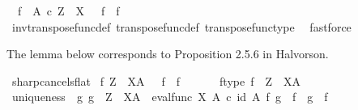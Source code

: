 \begin{isabellebody}
\ \ {\isachardoublequoteopen}f\ {\isacharcolon}{\kern0pt}\ A\ {\isasymtimes}\isactrlsub c\ Z\ {\isasymrightarrow}\ X\ \ {\isasymLongrightarrow}\ {\isacharparenleft}{\kern0pt}f\isactrlsup {\isasymsharp}{\isacharparenright}{\kern0pt}\isactrlsup {\isasymflat}\ {\isacharequal}{\kern0pt}\ f{\isachardoublequoteclose}\isanewline
%
\isadelimproof
\ \ %
\endisadelimproof
%
\isatagproof
{}\isamarkupfalse%
\ inv{\isacharunderscore}{\kern0pt}transpose{\isacharunderscore}{\kern0pt}func{\isacharunderscore}{\kern0pt}def{}\ transpose{\isacharunderscore}{\kern0pt}func{\isacharunderscore}{\kern0pt}def\ transpose{\isacharunderscore}{\kern0pt}func{\isacharunderscore}{\kern0pt}type\ \isamarkupfalse%
\ fastforce%
\endisatagproof
{\isafoldproof}%
%
\isadelimproof
%
\endisadelimproof
%
\begin{isamarkuptext}%
The lemma below corresponds to Proposition 2.5.6 in Halvorson.%
\end{isamarkuptext}\isamarkuptrue%
\isamarkupfalse%
\ sharp{\isacharunderscore}{\kern0pt}cancels{\isacharunderscore}{\kern0pt}flat{\isacharcolon}{\kern0pt}\isanewline
\ {\isachardoublequoteopen}f{\isacharcolon}{\kern0pt}\ Z\ {\isasymrightarrow}\ X\isactrlbsup A\isactrlesup \ \ {\isasymLongrightarrow}\ {\isacharparenleft}{\kern0pt}f\isactrlsup {\isasymflat}{\isacharparenright}{\kern0pt}\isactrlsup {\isasymsharp}\ {\isacharequal}{\kern0pt}\ f{\isachardoublequoteclose}\isanewline
%
\isadelimproof
%
\endisadelimproof
%
\isatagproof
{}\isamarkupfalse%
\ {\isacharminus}{\kern0pt}\ \isanewline
\ \ \isamarkupfalse%
\ f{\isacharunderscore}{\kern0pt}type{\isacharcolon}{\kern0pt}\ {\isachardoublequoteopen}f\ {\isacharcolon}{\kern0pt}\ Z\ {\isasymrightarrow}\ X\isactrlbsup A\isactrlesup {\isachardoublequoteclose}\isanewline
\ \ \isamarkupfalse%
\ \isamarkupfalse%
\ uniqueness{\isacharcolon}{\kern0pt}\ {\isachardoublequoteopen}{\isasymforall}\ g{\isachardot}{\kern0pt}\ g\ {\isacharcolon}{\kern0pt}\ Z\ {\isasymrightarrow}\ X\isactrlbsup A\isactrlesup \ {\isasymlongrightarrow}\ eval{\isacharunderscore}{\kern0pt}func\ X\ A\ {\isasymcirc}\isactrlsub c\ {\isacharparenleft}{\kern0pt}id\ A\ {\isasymtimes}\isactrlsub f\ g{\isacharparenright}{\kern0pt}\ {\isacharequal}{\kern0pt}\ f\isactrlsup {\isasymflat}\ {\isasymlongrightarrow}\ g\ {\isacharequal}{\kern0pt}\ {\isacharparenleft}{\kern0pt}f\isactrlsup {\isasymflat}{\isacharparenright}{\kern0pt}\isactrlsup {\isasymsharp}{\isachardoublequoteclose}\isanewline
\ \ \ \ \isamarkupfalse%

\end{isabellebody}
